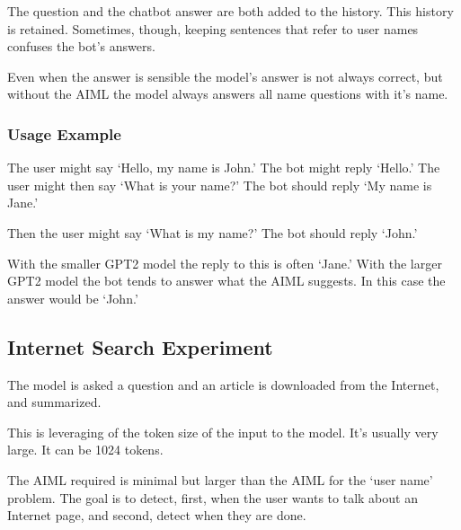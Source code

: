 The question and the chatbot answer are both added to the history. 
This history is retained. 
Sometimes, though, keeping sentences that refer to user names confuses the bot's answers.%

Even when the answer is sensible the model's answer is not always correct, but without the AIML the model always answers all name questions with it's name. 


\subsubsection{Usage Example}

The user might say `Hello, my name is John.' The bot might reply `Hello.' The user might then say `What is your name?' The bot should reply `My name is Jane.'

Then the user might say `What is my name?' The bot should reply `John.'

With the smaller GPT2 model the reply to this is often `Jane.' %
With the larger GPT2 model the bot tends to answer what the AIML suggests. In this case the answer would be `John.'

\subsection{Internet Search Experiment}
The model is asked a question and an article is downloaded from the Internet, and summarized. %

This is leveraging of the token size of the input to the model. It's usually very large. It can be 1024 tokens.

The AIML required is minimal but larger than the AIML for the `user name' problem. The goal is to detect, first, when the user wants to talk about an Internet page, and second, detect when they are done.

